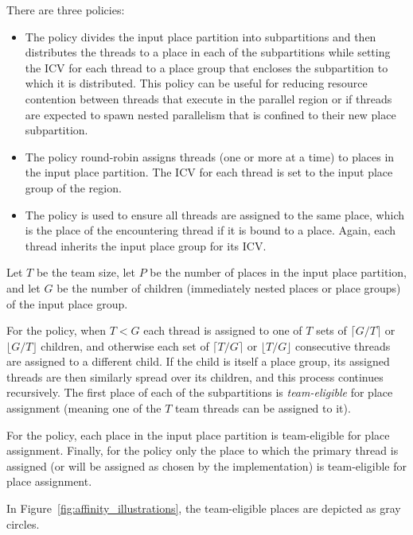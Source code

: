 There are three policies:

\begin{itemize}
\item The  policy divides the input place partition into
subpartitions and then distributes the threads to a place in each of the
subpartitions while setting the  ICV for each
thread to a place group that encloses the subpartition to which it is
distributed. This policy can be useful for reducing resource
contention between threads that execute in the parallel region
or if threads are expected to spawn nested parallelism that is
confined to their new place subpartition. 

\item The  policy round-robin assigns threads (one or more at a
time) to places in the input place partition. The 
ICV for each thread is set to the input place group of the region.

\item The  policy is used to ensure all threads are assigned to
the same place, which is the place of the encountering thread if it is bound to
a place. Again, each thread inherits the input place group for its
 ICV.
\end{itemize} 

Let $T$ be the team size, let $P$ be the number of places in the input place
partition, and let $G$ be the number of children (immediately nested places or
place groups) of the input place group.

For the  policy, when $T < G$ each thread is assigned to one of
$T$ sets of $\lceil G/T \rceil$ or $\lfloor G/T \rfloor$ children, and
otherwise each set of $\lceil T/G \rceil$ or $\lfloor T/G \rfloor$ consecutive
threads are assigned to a different child. If the child is itself a place
group, its assigned threads are then similarly spread over its children, and
this process continues recursively. The first place of each of the
subpartitions is \emph{team-eligible} for place assignment (meaning one of the
$T$ team threads can be assigned to it).

For the  policy, each place in the input place partition is
team-eligible for place assignment.  Finally, for the  policy
only the place to which the primary thread is assigned (or will be assigned as
chosen by the implementation) is team-eligible for place assignment.

In Figure~\ref{fig:affinity_illustrations}, the team-eligible places are depicted
as gray circles.

